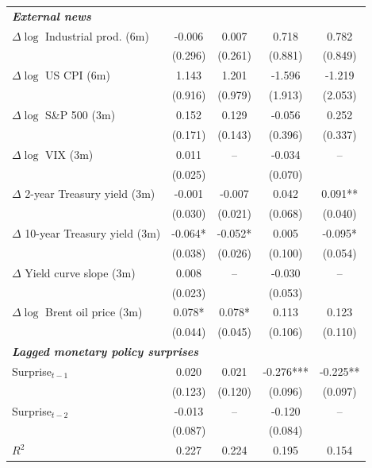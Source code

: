\documentclass[12pt, reqno]{article}
\begin{document}
\begin{table}[htbp]
\begin{center}
{\begin{tabular}{lcccc}
\multicolumn{5}{l}{\textbf{\emph{External news}}} \\[0.2em]

$\Delta \log$ Industrial prod. (6m)
& -0.006 & 0.007 
& 0.718 & 0.782 \\
& (0.296) & (0.261)
& (0.881) & (0.849) \\

$\Delta \log$ US CPI (6m)
& 1.143 & 1.201 
& -1.596 & -1.219 \\
& (0.916) & (0.979)
& (1.913) & (2.053) \\

$\Delta \log$ S\&P 500 (3m)
& 0.152 & 0.129 
& -0.056 & 0.252 \\
& (0.171) & (0.143)
& (0.396) & (0.337) \\

$\Delta \log$ VIX (3m)
& 0.011 & -- 
& -0.034 & -- \\
& (0.025) & 
& (0.070) & \\

$\Delta$ 2-year Treasury yield (3m)
& -0.001 & -0.007 
& 0.042 & 0.091** \\
& (0.030) & (0.021)
& (0.068) & (0.040) \\

$\Delta$ 10-year Treasury yield (3m)
& -0.064* & -0.052* 
& 0.005 & -0.095* \\
& (0.038) & (0.026)
& (0.100) & (0.054) \\

$\Delta$ Yield curve slope (3m)
& 0.008 & -- 
& -0.030 & -- \\
& (0.023) & 
& (0.053) & \\

$\Delta \log$ Brent oil price (3m)
& 0.078* & 0.078* 
& 0.113 & 0.123 \\
& (0.044) & (0.045)
& (0.106) & (0.110) \\[0.4em]

\multicolumn{5}{l}{\textbf{\emph{Lagged monetary policy surprises}}} \\[0.2em]

Surprise$_{t-1}$
& 0.020 & 0.021 
& -0.276*** & -0.225** \\
& (0.123) & (0.120)
& (0.096) & (0.097) \\

Surprise$_{t-2}$
& -0.013 & -- 
& -0.120 & -- \\
& (0.087) & 
& (0.084) & \\

\midrule
$R^2$
& 0.227 & 0.224
& 0.195 & 0.154 \\


\end{tabular}}
\end{center}
\end{table}
\end{document}
